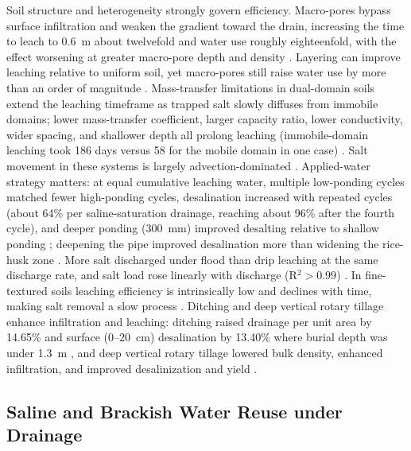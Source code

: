 \documentclass[11pt]{article}
\begin{document}
Soil structure and heterogeneity strongly govern efficiency. Macro-pores bypass surface infiltration and weaken the gradient toward the drain, increasing the time to leach to 0.6~m about twelvefold and water use roughly eighteenfold, with the effect worsening at greater macro-pore depth and density \parencite{Xin2016}. Layering can improve leaching relative to uniform soil, yet macro-pores still raise water use by more than an order of magnitude \parencite{Xin2016}. Mass-transfer limitations in dual-domain soils extend the leaching timeframe as trapped salt slowly diffuses from immobile domains; lower mass-transfer coefficient, larger capacity ratio, lower conductivity, wider spacing, and shallower depth all prolong leaching (immobile-domain leaching took 186 days versus 58 for the mobile domain in one case) \parencite{Zhang2024}. Salt movement in these systems is largely advection-dominated \parencite{Yu2018}. Applied-water strategy matters: at equal cumulative leaching water, multiple low-ponding cycles matched fewer high-ponding cycles, desalination increased with repeated cycles (about 64\% per saline-saturation drainage, reaching about 96\% after the fourth cycle), and deeper ponding (300~mm) improved desalting relative to shallow ponding \parencite{Jia2023}; deepening the pipe improved desalination more than widening the rice-husk zone \parencite{Jia2023}. More salt discharged under flood than drip leaching at the same discharge rate, and salt load rose linearly with discharge (R$^2>0.99$) \parencite{Li2022}. In fine-textured soils leaching efficiency is intrinsically low and declines with time, making salt removal a slow process \parencite{MANN1982}. Ditching and deep vertical rotary tillage enhance infiltration and leaching: ditching raised drainage per unit area by 14.65\% and surface (0--20~cm) desalination by 13.40\% where burial depth was under 1.3~m \parencite{Tian2023}, and deep vertical rotary tillage lowered bulk density, enhanced infiltration, and improved desalinization and yield \parencite{Li2026}.

\subsection{Saline and Brackish Water Reuse under Drainage}
\end{document}
